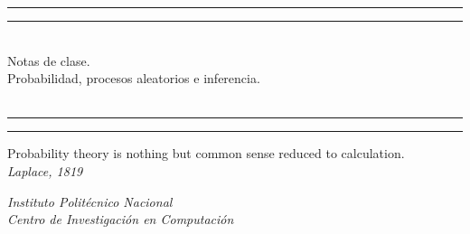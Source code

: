 

\begin{center}

\vspace*{\baselineskip} %


\rule{\textwidth}{1.6pt}\vspace*{-\baselineskip}\vspace*{2pt} %
\rule{\textwidth}{0.4pt} %

\vspace{0.75\baselineskip} %

{\LARGE \ \\Notas de clase.\\
Probabilidad, procesos aleatorios e inferencia. \\ 
\ \\} %

\vspace{0.75\baselineskip} %

\rule{\textwidth}{0.4pt}\vspace*{-\baselineskip}\vspace{3.2pt} %
\rule{\textwidth}{1.6pt} %

\vspace{2\baselineskip} %


Probability theory is nothing but common sense reduced to calculation. \\
\textit{Laplace, 1819}

\vspace*{3\baselineskip} %


\textit{Instituto Politécnico Nacional \\ Centro de Investigación en
Computación} %



\end{center}
